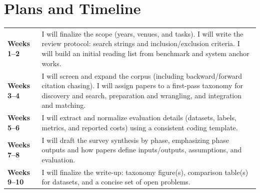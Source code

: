 \documentclass[11pt]{article}
\begin{document}
\section{Plans and Timeline}
\begin{tabularx}{\linewidth}{@{}L{2.6cm} @{\hspace{10pt}} Y@{}}
\textbf{Weeks 1--2} &
I will finalize the scope (years, venues, and tasks). I will write the review protocol: search strings and inclusion/exclusion criteria.
I will build an initial reading list from benchmark and system anchor works. \\[5pt]

\textbf{Weeks 3--4} &
I will screen and expand the corpus (including backward/forward citation chasing). I will assign papers to a first-pass taxonomy
for discovery and search, preparation and wrangling, and integration and matching. \\[5pt]

\textbf{Weeks 5--6} &
I will extract and normalize evaluation details (datasets, labels, metrics, and reported costs) using a consistent coding template. \\[5pt]

\textbf{Weeks 7--8} &
I will draft the survey synthesis by phase, emphasizing phase outputs and how papers define inputs/outputs, assumptions, and evaluation. \\[5pt]

\textbf{Weeks 9--10} &
I will finalize the write-up: taxonomy figure(s), comparison table(s) for datasets, and a concise set of open problems. \\
\end{tabularx}

\vspace{4pt}
{\small
}
\end{document}
